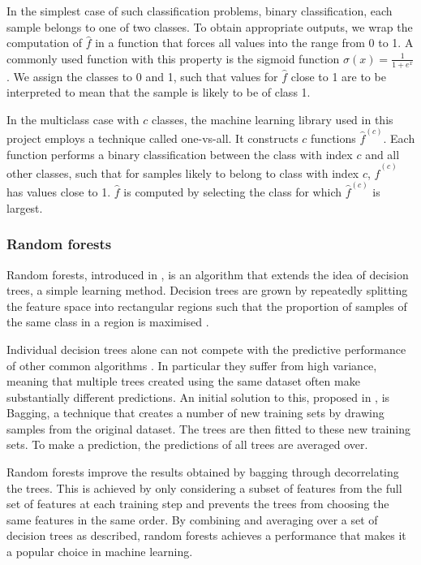 \documentclass[a4paper,12pt,twoside,openright]{report}
\begin{document}
In the simplest case of such classification problems, binary classification, each sample belongs to one of two classes. To obtain appropriate outputs, we wrap the computation of $\hat{f}$ in a function that forces all values into the range from 0 to 1. A commonly used function with this property is the sigmoid function $\sigma(x) = \frac{1}{1+e^x}$. We assign the classes to 0 and 1, such that values for $\hat{f}$ close to 1 are to be interpreted to mean that the sample is likely to be of class 1.

In the multiclass case with $c$ classes, the machine learning library used in this project employs a technique called one-vs-all. It constructs $c$ functions $\hat{f}^{(c)}$. Each function performs a binary classification between the class with index $c$ and all other classes, such that for samples likely to belong to class with index $c$, $\hat{f}^{(c)}$ has values close to 1. $\hat{f}$ is computed by selecting the class for which $\hat{f}^{(c)}$ is largest.

\subsubsection{Random forests}
Random forests, introduced in \cite{rndforests}, is an algorithm that extends the idea of decision trees, a simple learning method. Decision trees are grown by repeatedly splitting the feature space into rectangular regions such that the proportion of samples of the same class in a region is maximised \cite{james2014introduction}. 

Individual decision trees alone can not compete with the predictive performance of other common algorithms \cite{hastie01statisticallearning}. In particular they suffer from high variance, meaning that multiple trees created using the same dataset often make substantially different predictions. An initial solution to this, proposed in \cite{bagging}, is Bagging, a technique that creates a number of new training sets by drawing samples from the original dataset. The trees are then fitted to these new training sets. To make a prediction, the predictions of all trees are averaged over.

Random forests improve the results obtained by bagging through decorrelating the trees. This is achieved by only considering a subset of features from the full set of features at each training step and prevents the trees from choosing the same features in the same order. By combining and averaging over a set of decision trees as described, random forests achieves a performance that makes it a popular choice in machine learning.
\end{document}
